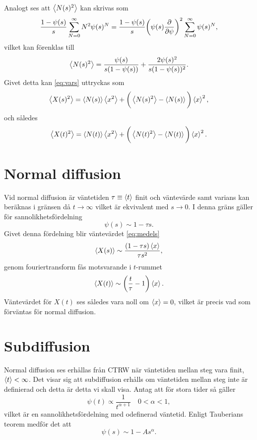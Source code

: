 Analogt ses att $\ev{N(s)^2}$ kan skrivas som
\begin{equation}
   \frac{1-\psi (s)}{s}\sum_{N=0}^{\infty}N^2\psi (s)^N = \frac{1-\psi (s)}{s}\bigg (\psi (s)\frac{\partial}{\partial \psi} \bigg )^2\sum_{N=0}^{\infty}\psi (s)^N,
\end{equation}
vilket kan förenklas till 
\begin{equation}
   \ev{N(s)^2} = \frac{\psi (s)}{s(1-\psi (s))}+\frac{2\psi(s)^2}{s(1-\psi (s))^2}.
\end{equation}
Givet detta kan \eqref{eq:vars} uttryckas som 
\begin{equation}
   \ev{X(s)^2} = \ev{N(s)}\ev{x^2}+\bigg (\ev{N(s)^2}-\ev{N(s)}\bigg )\ev{x}^2,
\end{equation}
och således
\begin{equation}
      \ev{X(t)^2} = \ev{N(t)}\ev{x^2}+\bigg (\ev{N(t)^2}-\ev{N(t)}\bigg )\ev{x}^2.
\end{equation}





\section{Normal diffusion}
Vid normal diffusion är väntetiden $\tau\equiv\ev{t}$ finit och väntevärde samt varians kan beräknas i gränsen då $t\to\infty$ vilket är ekvivalent med $s\to0$. I denna gräns gäller för  sannolikhetsfördelning 
\begin{equation}
\psi(s) \sim 1-\tau s.
\end{equation}
Givet denna fördelning blir väntevärdet \eqref{eq:medels}
\begin{equation}
\ev{X(s)} \sim \frac{(1-\tau s)\ev{x}}{\tau s^2},
\end{equation}
genom fouriertransform fås motsvarande i $t$-rummet
\begin{equation}
\ev{X(t)} \sim \bigg (\frac{t}{\tau}-1\bigg )\ev{x}.
\end{equation}
Väntevärdet för $X(t)$ ses således vara noll om $\ev{x}=0$, vilket är precis vad som förväntas för normal diffusion. 


\section{Subdiffusion}

Normal diffusion ses erhållas från CTRW när väntetiden mellan steg vara finit, $\ev{t}<\infty$. Det visar sig att subdiffusion erhålls om väntetiden mellan steg inte är definierad och detta är detta vi skall visa. Antag att för stora tider så gäller 
\begin{equation}
\psi(t) \propto \frac{1}{t^{\alpha+1}}\quad 0<\alpha<1,
\end{equation}
vilket är en sannolikhetsfördelning med odefinerad väntetid. Enligt Tauberians teorem\cite{Feller_prob1971} medför det att 
\begin{equation}
    \psi(s) \sim 1-As^{\alpha}.
\end{equation}

